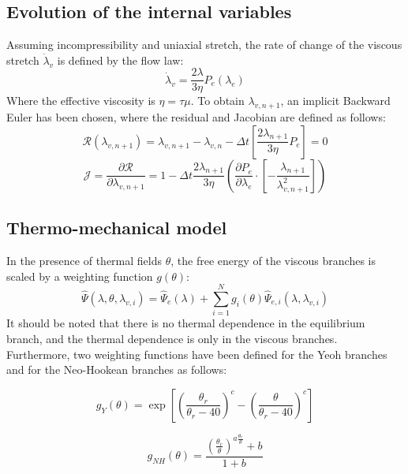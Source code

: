 \documentclass[a4paper,12pt]{article}
\newcommand{\pder}[2]{\frac{\partial #1}{\partial #2}}
\newcommand{\0}{\mathbf{0}}
\begin{document}
\subsection{Evolution of the internal variables}
Assuming incompressibility and uniaxial stretch, the rate of change of the viscous stretch $\dot{\lambda}_v$ is defined by the flow law:
\begin{equation}
    \dot{\lambda}_v = \frac{2\lambda}{3\eta} P_{e}(\lambda_e)
\end{equation}
Where the effective viscosity is $\eta = \tau \mu$.
To obtain $\lambda_{v,n+1}$, an implicit Backward Euler has been chosen, where the residual and Jacobian are defined as follows:
\begin{equation}
    \mathcal{R}(\lambda_{v,n+1}) = \lambda_{v,n+1} - \lambda_{v,n} - \Delta t \left[ \frac{2\lambda_{n+1}}{3\eta} P_{e} \right] = 0
\end{equation}
\begin{equation}
    \mathcal{J} = \pder{\mathcal{R}}{\lambda_{v,n+1}} = 1 - \Delta t \frac{2\lambda_{n+1}}{3\eta} \left( \pder{P_e}{\lambda_e} \cdot \left[ -\frac{\lambda_{n+1}}{\lambda_{v,n+1}^2} \right] \right)
\end{equation}



\subsection{Thermo-mechanical model}
In the presence of thermal fields $\theta$, the free energy of the viscous branches is scaled by a weighting function $g(\theta)$:
\begin{equation}
    \hat\Psi(\lambda, \theta, \lambda_{v,i}) = \hat\Psi_{e}(\lambda) + \sum_{i=1}^N g_i(\theta) \hat\Psi_{e,i}(\lambda, \lambda_{v,i})
\end{equation}
It should be noted that there is no thermal dependence in the equilibrium branch, and the thermal dependence is only in the viscous branches.
Furthermore, two weighting functions have been defined for the Yeoh branches and for the Neo-Hookean branches as follows:

\begin{equation}
g_{Y}(\theta) = \exp \left[ \left( \frac{\theta_r}{\theta_r - 40} \right)^c - \left( \frac{\theta}{\theta_r - 40} \right)^c \right]
\end{equation}

\begin{equation}
g_{NH}(\theta) = \frac{\left( \frac{\theta_r}{\theta} \right)^{a \frac{\theta_r}{\theta}} + b}{1 + b}
\end{equation}
\end{document}
